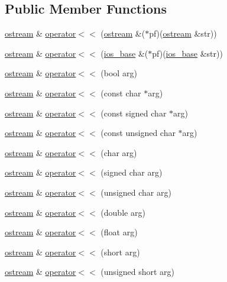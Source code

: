 \subsection*{Public Member Functions}
\begin{DoxyCompactItemize}
\item 
\hyperlink{classostream}{ostream} \& \hyperlink{classostream_a4dfc0cdb38bced959ba7cf963db38c30}{operator$<$$<$} (\hyperlink{classostream}{ostream} \&($\ast$pf)(\hyperlink{classostream}{ostream} \&str))
\item 
\hyperlink{classostream}{ostream} \& \hyperlink{classostream_af52c607ea168aff1025222c62cad392f}{operator$<$$<$} (\hyperlink{classios__base}{ios\+\_\+base} \&($\ast$pf)(\hyperlink{classios__base}{ios\+\_\+base} \&str))
\item 
\hyperlink{classostream}{ostream} \& \hyperlink{classostream_a63e3999be154253cf92a45c22e548f51}{operator$<$$<$} (bool arg)
\item 
\hyperlink{classostream}{ostream} \& \hyperlink{classostream_a618b5d6861dde2347847102b89e0ccfa}{operator$<$$<$} (const char $\ast$arg)
\item 
\hyperlink{classostream}{ostream} \& \hyperlink{classostream_aebe24ff723b806cbee19deb2165d0a5b}{operator$<$$<$} (const signed char $\ast$arg)
\item 
\hyperlink{classostream}{ostream} \& \hyperlink{classostream_ac0cf68ffa4706994f47acb1fa37c601a}{operator$<$$<$} (const unsigned char $\ast$arg)
\item 
\hyperlink{classostream}{ostream} \& \hyperlink{classostream_a1d1e11d2fadaf4c9e34194a1f28572e4}{operator$<$$<$} (char arg)
\item 
\hyperlink{classostream}{ostream} \& \hyperlink{classostream_ad06f8c6c47667e9c7b14620882c09434}{operator$<$$<$} (signed char arg)
\item 
\hyperlink{classostream}{ostream} \& \hyperlink{classostream_a69912ec4a8536f289b716e95953d09d7}{operator$<$$<$} (unsigned char arg)
\item 
\hyperlink{classostream}{ostream} \& \hyperlink{classostream_a8065697d56d5e5d1a0ca50c1916b4955}{operator$<$$<$} (double arg)
\item 
\hyperlink{classostream}{ostream} \& \hyperlink{classostream_a6c68e418e19d9dcdfe6b1790b2621666}{operator$<$$<$} (float arg)
\item 
\hyperlink{classostream}{ostream} \& \hyperlink{classostream_a227c47e2b631f29d8873b00290bb4872}{operator$<$$<$} (short arg)
\item 
\hyperlink{classostream}{ostream} \& \hyperlink{classostream_ace10a3a767dc55faff2cec71cd0a89b1}{operator$<$$<$} (unsigned short arg)

\end{DoxyCompactItemize}

